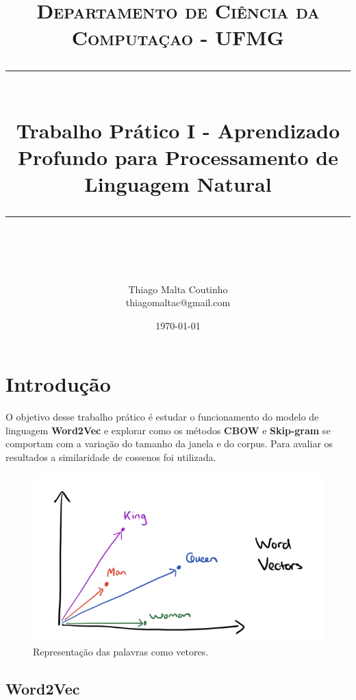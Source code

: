 \documentclass[11pt]{scrartcl} %
\title{	
	\normalfont\normalsize
	\textsc{Departamento de Ciência da Computaçao - UFMG}\\ %
	\vspace{25pt} %
	\rule{\linewidth}{0.5pt}\\ %
	\vspace{20pt} %
	{\huge Trabalho Prático I - Aprendizado Profundo para Processamento de Linguagem Natural}\\ %
	\vspace{12pt} %
	\rule{\linewidth}{2pt}\\ %
	\vspace{12pt} %
}
\author{\LARGE Thiago Malta Coutinho\\ thiagomaltac@gmail.com} %
\date{\normalsize\today} %
\begin{document}
\maketitle %


\section{Introdução}

O objetivo desse trabalho prático é estudar o funcionamento do modelo de linguagem \textbf{Word2Vec} e explorar como os métodos \textbf{CBOW} e \textbf{Skip-gram} se comportam com a variação do tamanho da janela e do corpus. Para avaliar os resultados a similaridade de cossenos foi utilizada.

\begin{figure}[h] %
	\centering
	\includegraphics[width=0.5\columnwidth]{./Figures/word2vec.png} %
	\caption{Representação das palavras como vetores.}
\end{figure}


\subsection{Word2Vec}
\end{document}
